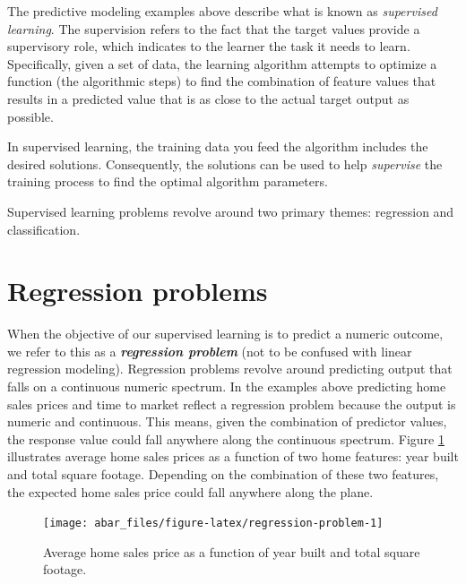 \documentclass[]{book}
\theoremstyle{definition}
\theoremstyle{definition}
\theoremstyle{definition}
\theoremstyle{remark}
\begin{document}
The predictive modeling examples above describe what is known as
\emph{supervised learning}. The supervision refers to the fact that the
target values provide a supervisory role, which indicates to the learner
the task it needs to learn. Specifically, given a set of data, the
learning algorithm attempts to optimize a function (the algorithmic
steps) to find the combination of feature values that results in a
predicted value that is as close to the actual target output as
possible.

\begin{note}
In supervised learning, the training data you feed the algorithm
includes the desired solutions. Consequently, the solutions can be used
to help \emph{supervise} the training process to find the optimal
algorithm parameters.
\end{note}

Supervised learning problems revolve around two primary themes:
regression and classification.

\hypertarget{regression-problems}{%
\section{Regression problems}\label{regression-problems}}

When the objective of our supervised learning is to predict a numeric
outcome, we refer to this as a \textbf{\emph{regression problem}} (not
to be confused with linear regression modeling). Regression problems
revolve around predicting output that falls on a continuous numeric
spectrum. In the examples above predicting home sales prices and time to
market reflect a regression problem because the output is numeric and
continuous. This means, given the combination of predictor values, the
response value could fall anywhere along the continuous spectrum. Figure
\ref{fig:regression-problem} illustrates average home sales prices as a
function of two home features: year built and total square footage.
Depending on the combination of these two features, the expected home
sales price could fall anywhere along the plane.

\begin{figure}

{\centering \texttt{[image: abar\_files/figure-latex/regression-problem-1]} 

}

\caption{Average home sales price as a function of year built and total square footage.}\label{fig:regression-problem}
\end{figure}
\end{document}
